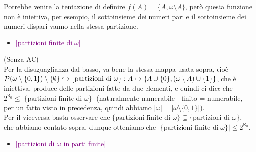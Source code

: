 \begin{note}
	Potrebbe venire la tentazione di definire $f(A) = \{A, \omega\setminus A\}$, però questa funzione non è iniettiva, per esempio, il sottoinsieme dei numeri pari e il sottoinsieme dei numeri dispari vanno nella stessa partizione.
\end{note}

\begin{itemize}
	\item \textcolor{purple}{$|$partizioni finite di $\omega|$}
\end{itemize}

\begin{soln}
	(Senza AC)\\
	Per la disuguaglianza dal basso, va bene la stessa mappa usata sopra, cioè $\mathcal{P}(\omega\setminus\{0,1\})\setminus\{\emptyset\} \hookrightarrow \{\text{partizioni di $\omega$}\} : A \mapsto \{A\cup \{0\},(\omega\setminus A)\cup \{1\}\}$, che è iniettiva, produce delle partizioni fatte da due elementi, e quindi ci dice che $2^{\aleph_0} \leq |\{\text{partizioni finite di $\omega$}\}|$ (naturalmente numerabile - finito = numerabile, per un fatto visto in precedenza, quindi abbiamo $|\omega| = |\omega \setminus\{0,1\}|$).\\
	Per il viceversa basta osservare che $\{\text{partizioni finite di $\omega$}\} \subseteq \{\text{partizioni di $\omega$}\}$, che abbiamo contato sopra, dunque otteniamo che $|\{\text{partizioni finite di $\omega$}\}| \leq 2^{\aleph_0}$.
\end{soln}
\pagebreak
\begin{itemize}
	\item \textcolor{purple}{$|$partizioni di $\omega$ in parti finite$|$}
\end{itemize}

